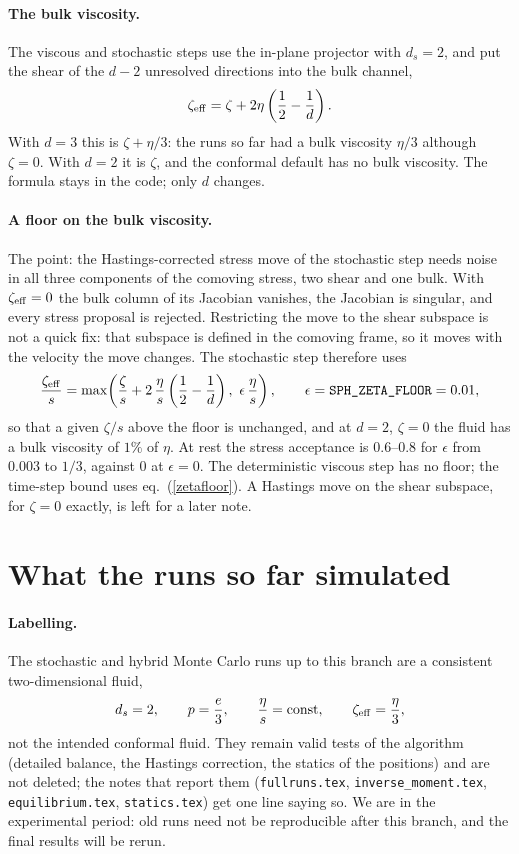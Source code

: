 \documentclass[11pt,aps,preprint,nofootinbib,superscriptaddress,tightenlines]{revtex4-2}
\def\st{\begin{equation}}
\def\stp{\end{equation}}
\def\Eq#1{eq.~(\ref{#1})}
\let\oldparagraph\paragraph
\renewcommand{\paragraph}{\par\bigskip\oldparagraph}
\begin{document}
\paragraph{The bulk viscosity.}  The viscous and stochastic steps use the in-plane projector with $d_s=2$, and put the shear of the
$d-2$ unresolved directions into the bulk channel,
\st
\zeta_{\rm eff}=\zeta+2\eta\left(\frac12-\frac1d\right) .
\label{zetaeff}
\stp
With $d=3$ this is $\zeta+\eta/3$: the runs so far had a bulk viscosity $\eta/3$ although $\zeta=0$.  With $d=2$ it is $\zeta$, and the
conformal default has no bulk viscosity.  The formula stays in the code; only $d$ changes.

\paragraph{A floor on the bulk viscosity.}  The point: the Hastings-corrected stress move of the stochastic step needs noise in all
three components of the comoving stress, two shear and one bulk.  With $\zeta_{\rm eff}=0$ the bulk column of its Jacobian vanishes,
the Jacobian is singular, and every stress proposal is rejected.  Restricting the move to the shear subspace is not a quick fix: that
subspace is defined in the comoving frame, so it moves with the velocity the move changes.  The stochastic step therefore uses
\st
\frac{\zeta_{\rm eff}}{s}=\max\!\left(\frac{\zeta}{s}+2\,\frac{\eta}{s}\left(\frac12-\frac1d\right),\ \epsilon\,\frac{\eta}{s}\right),
\qquad \epsilon=\texttt{SPH\_ZETA\_FLOOR}=0.01 ,
\label{zetafloor}
\stp
so that a given $\zeta/s$ above the floor is unchanged, and at $d=2$, $\zeta=0$ the fluid has a bulk viscosity of $1\%$ of $\eta$.  At
rest the stress acceptance is $0.6$--$0.8$ for $\epsilon$ from $0.003$ to $1/3$, against $0$ at $\epsilon=0$.  The deterministic viscous
step has no floor; the time-step bound uses \Eq{zetafloor}.  A Hastings move on the shear subspace, for $\zeta=0$ exactly, is left for
a later note.

\section{What the runs so far simulated}
\label{sec:labels}

\paragraph{Labelling.}  The stochastic and hybrid Monte Carlo runs up to this branch are a consistent two-dimensional fluid,
\st
d_s=2,\qquad p=\frac{e}{3},\qquad \frac{\eta}{s}=\text{const},\qquad \zeta_{\rm eff}=\frac{\eta}{3},
\stp
not the intended conformal fluid.  They remain valid tests of the algorithm (detailed balance, the Hastings correction, the statics of
the positions) and are not deleted; the notes that report them (\texttt{fullruns.tex}, \texttt{inverse\_moment.tex},
\texttt{equilibrium.tex}, \texttt{statics.tex}) get one line saying so.  We are in the experimental period: old runs need not be
reproducible after this branch, and the final results will be rerun.
\end{document}
